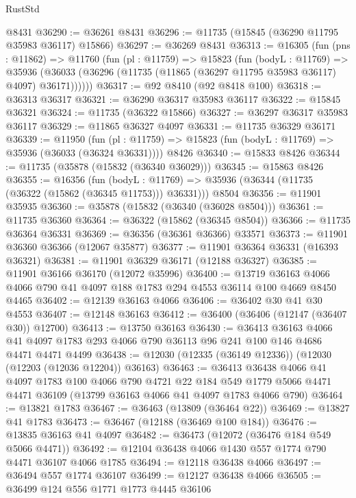 \begin{lexlean}{RustStd}
\begin{coremodule}
    @8431
@36290 := @36261 @8431
@36296 := @11735 (@15845 (@36290 @11795 @35983 @36117) @15866)
@36297 := @36269 @8431
@36313 := @16305
    (fun (pns : @11862) =>
    @11760
      (fun (pl : @11759) =>
      @15823
        (fun (bodyL : @11769) =>
        @35936 (@36033 (@36296 (@11735 (@11865 (@36297 @11795 @35983 @36117) @4097) @36171))))))
@36317 := @92 @8410 (@92 @8418 @100)
@36318 := @36313 @36317
@36321 := @36290 @36317 @35983 @36117
@36322 := @15845 @36321
@36324 := @11735 (@36322 @15866)
@36327 := @36297 @36317 @35983 @36117
@36329 := @11865 @36327 @4097
@36331 := @11735 @36329 @36171
@36339 := @11950
    (fun (pl : @11759) => @15823 (fun (bodyL : @11769) => @35936 (@36033 (@36324 @36331))))
    @8426
@36340 := @15833 @8426
@36344 := @11735 (@35878 (@15832 (@36340 @36029)))
@36345 := @15863 @8426
@36355 := @16356
    (fun (bodyL : @11769) => @35936 (@36344 (@11735 (@36322 (@15862 (@36345 @11753))) @36331)))
    @8504
@36356 := @11901 @35935
@36360 := @35878 (@15832 (@36340 (@36028 @8504)))
@36361 := @11735 @36360
@36364 := @36322 (@15862 (@36345 @8504))
@36366 := @11735 @36364 @36331
@36369 := @36356 (@36361 @36366) @33571
@36373 := @11901 @36360 @36366 (@12067 @35877)
@36377 := @11901 @36364 @36331 (@16393 @36321)
@36381 := @11901 @36329 @36171 (@12188 @36327)
@36385 := @11901 @36166 @36170 (@12072 @35996)
@36400 := @13719
    @36163
    @4066
    @4066
    @790
    @41
    @4097
    @188
    @1783
    @294
    @4553
    @36114
    @100
    @4669
    @8450
    @4465
@36402 := @12139 @36163 @4066
@36406 := @36402 @30 @41 @30 @4553
@36407 := @12148 @36163
@36412 := @36400 (@36406 (@12147 (@36407 @30)) @12700)
@36413 := @13750 @36163
@36430 := @36413
    @36163
    @4066
    @41
    @4097
    @1783
    @293
    @4066
    @790
    @36113
    @96
    @241
    @100
    @146
    @4686
    @4471
    @4471
    @4499
@36438 := @12030 (@12335 (@36149 @12336)) (@12030 (@12203 (@12036 @12204)) @36163)
@36463 := @36413
    @36438
    @4066
    @41
    @4097
    @1783
    @100
    @4066
    @790
    @4721
    @22
    @184
    @549
    @1779
    @5066
    @4471
    @4471
    @36109
    (@13799 @36163 @4066 @41 @4097 @1783 @4066 @790)
@36464 := @13821 @1783
@36467 := @36463 (@13809 (@36464 @22))
@36469 := @13827 @41 @1783
@36473 := @36467 (@12188 (@36469 @100 @184))
@36476 := @13835 @36163 @41 @4097
@36482 := @36473 (@12072 (@36476 @184 @549 @5066 @4471))
@36492 := @12104 @36438 @4066 @1430 @557 @1774 @790 @4471 @36107 @4066 @1785
@36494 := @12118 @36438 @4066
@36497 := @36494 @557 @1774 @36107
@36499 := @12127 @36438 @4066
@36505 := @36499 @124 @556 @1771 @1773 @4445 @36106

\end{coremodule}
\end{lexlean}
